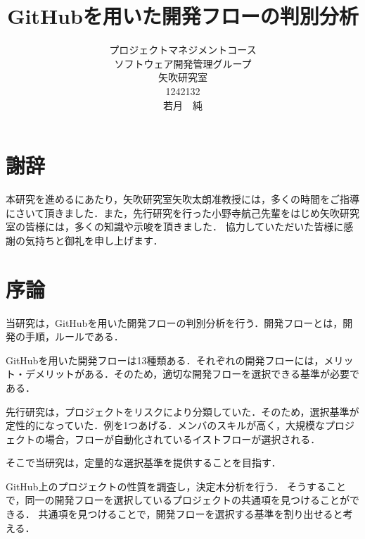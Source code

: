 \title{GitHubを用いた開発フローの判別分析}
\author{プロジェクトマネジメントコース\\
ソフトウェア開発管理グループ\\
矢吹研究室\\
1242132\\
若月　純}
\date{}

\maketitle


\chapter*{謝辞}

本研究を進めるにあたり，矢吹研究室矢吹太朗准教授には，多くの時間をご指導にさいて頂きました．また，先行研究を行った小野寺航己先輩をはじめ矢吹研究室の皆様には，多くの知識や示唆を頂きました．
協力していただいた皆様に感謝の気持ちと御礼を申し上げます．


\tableofcontents%

\chapter{序論}
当研究は，GitHubを用いた開発フローの判別分析を行う．開発フローとは，開発の手順，ルールである．

GitHubを用いた開発フローは13種類ある．それぞれの開発フローには，メリット・デメリットがある．そのため，適切な開発フローを選択できる基準が必要である．


先行研究は，プロジェクトをリスクにより分類していた．そのため，選択基準が定性的になっていた．例を1つあげる．メンバのスキルが高く，大規模なプロジェクトの場合，フローが自動化されているイストフローが選択される\cite{onodera2015}．

そこで当研究は，定量的な選択基準を提供することを目指す．

GitHub上のプロジェクトの性質を調査し，決定木分析を行う．
そうすることで，同一の開発フローを選択しているプロジェクトの共通項を見つけることができる．
共通項を見つけることで，開発フローを選択する基準を割り出せると考える．




